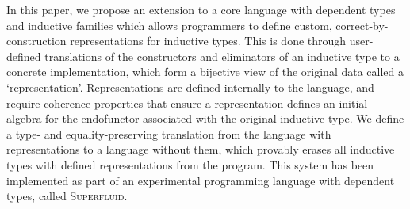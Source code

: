 In this paper, we propose an extension to a core language with dependent types
and inductive families which allows programmers to define custom,
correct-by-construction representations for inductive types. This is done
through user-defined translations of the constructors and eliminators of an
inductive type to a concrete implementation, which form a bijective view of the
original data called a `representation'. Representations are defined internally
to the language, and require coherence properties that ensure a representation
defines an initial algebra for the endofunctor associated with the original
inductive type. We define a type- and equality-preserving translation from the
language with representations to a language without them, which provably erases
all inductive types with defined representations from the program. This system
has been implemented as part of an experimental programming language with
dependent types, called \textsc{Superfluid}.
